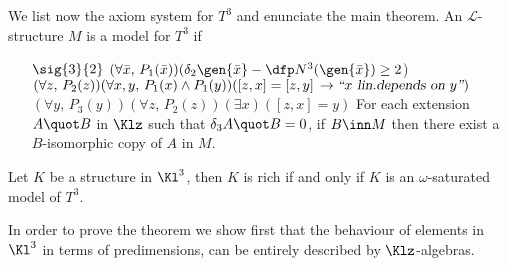 We list now the axiom system for $T^{3}$ and enunciate the main theorem. An $\mathcal{L}$-structure
$M$ is a model for $T^{3}$ if
\begin{itemize}
$M$ is in $\nla{3}$ and ${%
M\upharpoonright}_{\mathcal{L}^{2}}\sat T^{2}$ (\emph{vielleicht reichen wenige Axiome davon})
\item[$\sig{3}{2}$]$(\forall \bar x,\,P_{1}(\bar x))(\delta_{2}\gen{\bar x}-\dfp N^{3}(\gen{\bar x})\geq2$)
$(\forall z,\,P_{2}(z))(\forall x,y,\,P_{1}(x)\wedge P_{1}(y))([z,x]=[z,y]\,\rightarrow
\textsl{``$x$ lin.{}depends on $y$''})$
$(\forall y,\,P_{3}(y))(\forall z,\,P_{2}(z))(\exists x)([z,x]=y)$
For each extension $A\quot B$ in $\Klz$ such that $\delta_{3}A\quot B=0$,
if $B\inn M$ then there exist a $B$-isomorphic copy of $A$ in $M$.
\end{itemize}
\begin{teo}\label{richmodel}
Let $K$ be a structure in $\Kl^{3}$, then $K$ is rich if and only if $K$ is an $\omega$-saturated model
of $T^{3}$.
\end{teo}

In order to prove the theorem we 
show first that the behaviour of elements
in $\Kl^{3}$ in terms of predimensions, can be entirely described by $\Klz$-algebras.



